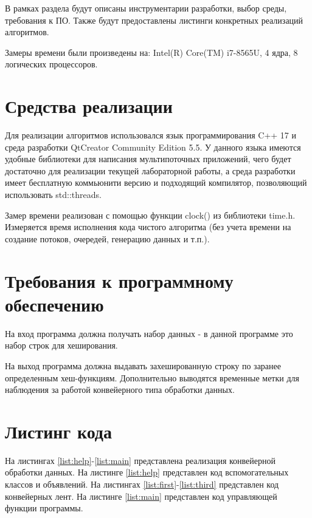 \documentclass[a4paper,12pt]{report}
\begin{document}
        \label{sec:tecnologic_part}
			В рамках раздела будут описаны инструментарии разработки, выбор среды, требования к ПО. 
			Также будут предоставлены листинги конкретных реализаций алгоритмов.
			
			Замеры времени были произведены на: Intel(R) Core(TM) i7-8565U, 4 ядра, 8 логических процессоров.
	
	\section{Средства реализации}	
			
			Для реализации алгоритмов использовался язык программирования C++ 17 и среда разработки QtCreator Community Edition 5.5. 
        	У данного языка имеются удобные библиотеки для написания мультипоточных приложений, чего будет достаточно для реализации текущей лабораторной работы, а среда разработки имеет бесплатную коммьюнити версию и подходящий компилятор, позволяющий использовать std::threads.
        	
        	Замер времени реализован с помощью функции clock() из библиотеки time.h.
        	Измеряется время исполнения кода чистого алгоритма (без учета времени на создание потоков, очередей, генерацию данных и т.п.).

	\section{Требования к программному обеспечению}

			На вход программа должна получать набор данных - в данной программе это набор строк для хеширования. 
			
			На выход программа должна выдавать захешированную строку по заранее определенным хеш-функциям. 
			Дополнительно выводятся временные метки для наблюдения за работой конвейерного типа обработки данных.

	\section{Листинг кода}
	
        	На листингах \ref{list:help}-\ref{list:main} представлена реализация конвейерной обработки данных.
	        На листинге \ref{list:help} представлен код вспомогательных классов и объявлений.
	        На листингах \ref{list:first}-\ref{list:third} представлен код конвейерных лент.
	        На листинге \ref{list:main} представлен код управляющей функции программы.
	        
\end{document}
